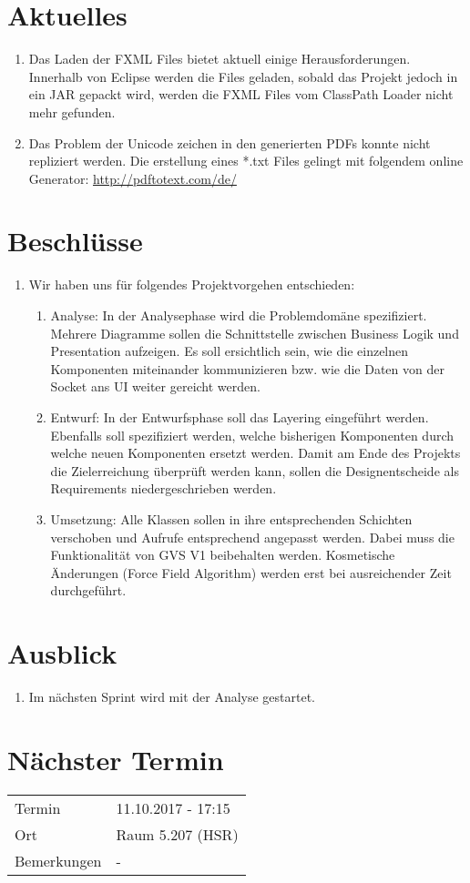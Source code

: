 \documentclass[11pt, a4paper,oneside]{scrartcl}
\begin{document}
\section{Aktuelles}
\begin{enumerate}
	\item Das Laden der FXML Files bietet aktuell einige Herausforderungen. Innerhalb von Eclipse werden die Files geladen, sobald das Projekt jedoch in ein JAR gepackt wird, werden die FXML Files vom ClassPath Loader nicht mehr gefunden.
	\item Das Problem der Unicode zeichen in den generierten PDFs konnte nicht repliziert werden. Die erstellung eines *.txt Files gelingt mit folgendem online Generator: \url{http://pdftotext.com/de/}
\end{enumerate}

\section{Beschlüsse}
\begin{enumerate}
	\item Wir haben uns für folgendes Projektvorgehen entschieden:
	\begin{enumerate}
		\item Analyse: In der Analysephase wird die Problemdomäne spezifiziert. Mehrere Diagramme sollen die Schnittstelle zwischen Business Logik und Presentation aufzeigen. Es soll ersichtlich sein, wie die einzelnen Komponenten miteinander kommunizieren bzw. wie die Daten von der Socket ans UI weiter gereicht werden.
		\item Entwurf: In der Entwurfsphase soll das Layering eingeführt werden. Ebenfalls soll spezifiziert werden, welche bisherigen Komponenten durch welche neuen Komponenten ersetzt werden. Damit am Ende des Projekts die Zielerreichung überprüft werden kann, sollen die Designentscheide als Requirements niedergeschrieben werden. 
		\item Umsetzung: Alle Klassen sollen in ihre entsprechenden Schichten verschoben und Aufrufe entsprechend angepasst werden. Dabei muss die Funktionalität von GVS V1 beibehalten werden. Kosmetische Änderungen (Force Field Algorithm) werden erst bei ausreichender Zeit durchgeführt.
	\end{enumerate}
\end{enumerate}

\section{Ausblick}
\begin{enumerate}
	\item Im nächsten Sprint wird mit der Analyse gestartet.
\end{enumerate}


\section{Nächster Termin}
\begin{tabu} to \linewidth {l X }
	\toprule
	Termin & 11.10.2017 - 17:15 \\
	Ort & Raum 5.207 (HSR) \\
	Bemerkungen & - \\
	\bottomrule
\end{tabu}
\end{document}
